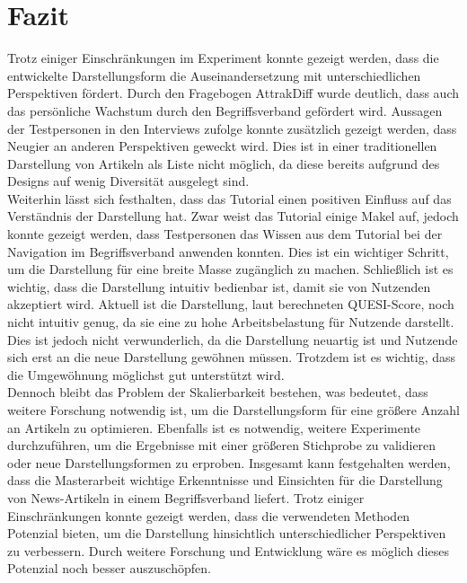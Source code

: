 \section{Fazit}\label{sec:conclusion}
Trotz einiger Einschränkungen im Experiment konnte gezeigt werden, dass die entwickelte Darstellungsform die Auseinandersetzung mit unterschiedlichen Perspektiven fördert.
Durch den Fragebogen AttrakDiff wurde deutlich, dass auch das persönliche Wachstum durch den Begriffsverband gefördert wird.
Aussagen der Testpersonen in den Interviews zufolge konnte zusätzlich gezeigt werden, dass Neugier an anderen Perspektiven geweckt wird.
Dies ist in einer traditionellen Darstellung von Artikeln als Liste nicht möglich, da diese bereits aufgrund des Designs auf wenig Diversität ausgelegt sind.\\

Weiterhin lässt sich festhalten, dass das Tutorial einen positiven Einfluss auf das Verständnis der Darstellung hat.
Zwar weist das Tutorial einige Makel auf, jedoch konnte gezeigt werden, dass Testpersonen das Wissen aus dem Tutorial bei der Navigation im Begriffsverband anwenden konnten.
Dies ist ein wichtiger Schritt, um die Darstellung für eine breite Masse zugänglich zu machen.
Schließlich ist es wichtig, dass die Darstellung intuitiv bedienbar ist, damit sie von Nutzenden akzeptiert wird.
Aktuell ist die Darstellung, laut berechneten \ac{QUESI}-Score, noch nicht intuitiv genug, da sie eine zu hohe Arbeitsbelastung für Nutzende darstellt.
Dies ist jedoch nicht verwunderlich, da die Darstellung neuartig ist und Nutzende sich erst an die neue Darstellung gewöhnen müssen.
Trotzdem ist es wichtig, dass die Umgewöhnung möglichst gut unterstützt wird. \\

Dennoch bleibt das Problem der Skalierbarkeit bestehen, was bedeutet, dass weitere Forschung notwendig ist, um die Darstellungsform für eine größere Anzahl an Artikeln zu optimieren.
Ebenfalls ist es notwendig, weitere Experimente durchzuführen, um die Ergebnisse mit einer größeren Stichprobe zu validieren oder neue Darstellungsformen zu erproben.
Insgesamt kann festgehalten werden, dass die Masterarbeit wichtige Erkenntnisse und Einsichten für die Darstellung von News-Artikeln in einem Begriffsverband liefert.
Trotz einiger Einschränkungen konnte gezeigt werden, dass die verwendeten Methoden Potenzial bieten, um die Darstellung hinsichtlich unterschiedlicher Perspektiven zu verbessern.
Durch weitere Forschung und Entwicklung wäre es möglich dieses Potenzial noch besser auszuschöpfen.
